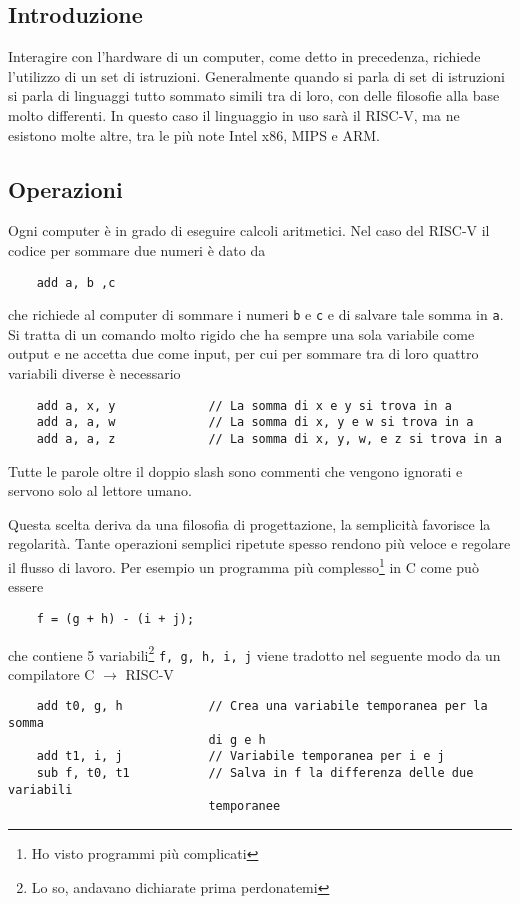 \documentclass[a4paper,12pt]{article}
\theoremstyle{break}
\newcommand{\code}[1]{\texttt{#1}}
\numberwithin{equation}{section}
\begin{document}
\subsection{Introduzione}
Interagire con l'hardware di un computer, come detto in precedenza, richiede l'utilizzo di un set di istruzioni. Generalmente quando si parla di set di istruzioni si parla di linguaggi tutto sommato simili tra di loro, con delle filosofie alla base molto differenti. In questo caso il linguaggio in uso sarà il RISC-V, ma ne esistono molte altre, tra le più note Intel x86, MIPS e ARM.
\subsection{Operazioni}
Ogni computer è in grado di eseguire calcoli aritmetici. Nel caso del RISC-V il codice per sommare due numeri è dato da
\begin{verbatim}
    add a, b ,c
\end{verbatim}
che richiede al computer di sommare i numeri \code{b} e \code{c} e di salvare tale somma in \code{a}.
Si tratta di un comando molto rigido che ha sempre una sola variabile come output e ne accetta due come input, per cui per sommare tra di loro quattro variabili diverse è necessario 
\begin{verbatim}
    add a, x, y             // La somma di x e y si trova in a
    add a, a, w             // La somma di x, y e w si trova in a
    add a, a, z             // La somma di x, y, w, e z si trova in a
\end{verbatim}
Tutte le parole oltre il doppio slash sono commenti che vengono ignorati e servono solo al lettore umano. 


Questa scelta deriva da una filosofia di progettazione, la semplicità favorisce la regolarità. Tante operazioni semplici ripetute spesso rendono più veloce e regolare il flusso di lavoro.
Per esempio un programma più complesso\footnote{Ho visto programmi più complicati} in C come può essere 
\begin{verbatim}
    f = (g + h) - (i + j);
\end{verbatim}
che contiene 5 variabili\footnote{Lo so, andavano dichiarate prima perdonatemi} \code{f, g, h, i, j} viene tradotto nel seguente modo da un compilatore C \(\to\) RISC-V
\begin{verbatim}
    add t0, g, h            // Crea una variabile temporanea per la somma 
                            di g e h
    add t1, i, j            // Variabile temporanea per i e j
    sub f, t0, t1           // Salva in f la differenza delle due variabili 
                            temporanee
\end{verbatim}
\end{document}
